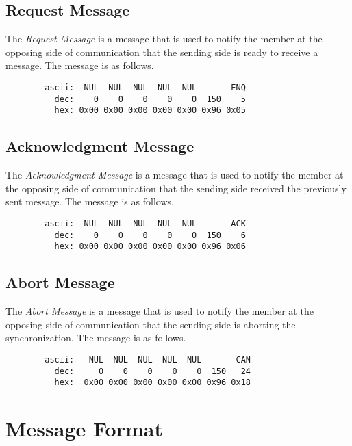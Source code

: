         \subsection{Request Message}

        The \emph{Request Message} is a message that is used to notify
        the member at the opposing side of communication that the sending
        side is ready to receive a message. The message is as follows.

        \begin{verbatim}
        ascii:  NUL  NUL  NUL  NUL  NUL       ENQ
          dec:    0    0    0    0    0  150    5 
          hex: 0x00 0x00 0x00 0x00 0x00 0x96 0x05
        \end{verbatim}

        \subsection{Acknowledgment Message}

        The \emph{Acknowledgment Message} is a message that is used to notify
        the member at the opposing side of communication that the sending
        side received the previously sent message. The message is as follows.

        \begin{verbatim}
        ascii:  NUL  NUL  NUL  NUL  NUL       ACK
          dec:    0    0    0    0    0  150    6 
          hex: 0x00 0x00 0x00 0x00 0x00 0x96 0x06
        \end{verbatim}

        \subsection{Abort Message}

        The \emph{Abort Message} is a message that is used to notify the
        member at the opposing side of communication that the sending
        side is aborting the synchronization. The message is as follows.

        \begin{verbatim}
        ascii:   NUL  NUL  NUL  NUL  NUL       CAN
          dec:     0    0    0    0    0  150   24
          hex:  0x00 0x00 0x00 0x00 0x00 0x96 0x18
        \end{verbatim}

    \section{Message Format}

